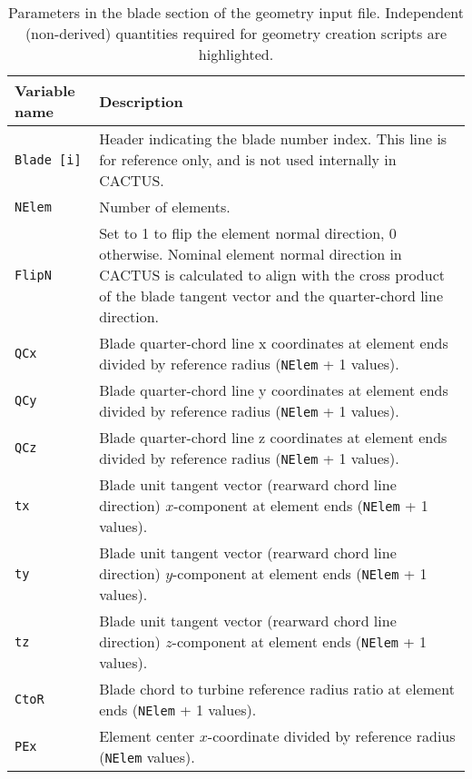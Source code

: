 \begin{longtable}{p{}p{}}
\caption[Parameters in the blade section of the geometry input file.]{Parameters in the blade section of the geometry input file. Independent (non-derived) quantities required for geometry creation scripts are highlighted.} \label{tbl:geometry_input_params_blade} \\
\toprule
Variable name & Description \\ \midrule
\texttt{Blade [i]} & Header indicating the blade number index. This line is for reference only, and is not used internally in CACTUS. \\
\rowcolor{highlightcolor}\texttt{NElem}   & Number of elements. \\
\rowcolor{highlightcolor}\texttt{FlipN}   & Set to 1 to flip the element normal direction, 0 otherwise. Nominal element normal direction in CACTUS is calculated to align with the cross product of the blade tangent vector and the quarter-chord line direction. \\
\rowcolor{highlightcolor}\texttt{QCx}     & Blade quarter-chord line x coordinates at element ends divided by reference radius (\texttt{NElem} + 1 values). \\
\rowcolor{highlightcolor}\texttt{QCy}     & Blade quarter-chord line y coordinates at element ends divided by reference radius (\texttt{NElem} + 1 values). \\
\rowcolor{highlightcolor}\texttt{QCz}     & Blade quarter-chord line z coordinates at element ends divided by reference radius (\texttt{NElem} + 1 values). \\
\rowcolor{highlightcolor}\texttt{tx}      & Blade unit tangent vector (rearward chord line direction) $x$-component at element ends (\texttt{NElem} + 1 values). \\
\rowcolor{highlightcolor}\texttt{ty}      & Blade unit tangent vector (rearward chord line direction) $y$-component at element ends (\texttt{NElem} + 1 values). \\
\rowcolor{highlightcolor}\texttt{tz}      & Blade unit tangent vector (rearward chord line direction) $z$-component at element ends (\texttt{NElem} + 1 values). \\
\rowcolor{highlightcolor}\texttt{CtoR}    & Blade chord to turbine reference radius ratio at element ends (\texttt{NElem} + 1 values). \\
\texttt{PEx}     & Element center $x$-coordinate divided by reference radius (\texttt{NElem} values). \\

\end{longtable}
